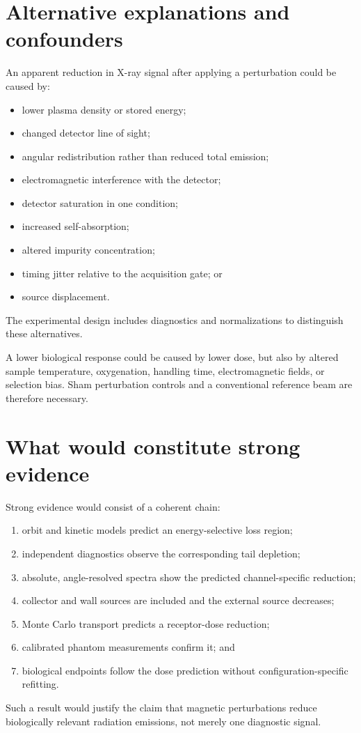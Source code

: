 \section{Alternative explanations and confounders}

An apparent reduction in X-ray signal after applying a perturbation could be caused by:
\begin{itemize}
\item lower plasma density or stored energy;
\item changed detector line of sight;
\item angular redistribution rather than reduced total emission;
\item electromagnetic interference with the detector;
\item detector saturation in one condition;
\item increased self-absorption;
\item altered impurity concentration;
\item timing jitter relative to the acquisition gate; or
\item source displacement.
\end{itemize}
The experimental design includes diagnostics and normalizations to distinguish these alternatives.

A lower biological response could be caused by lower dose, but also by altered sample temperature, oxygenation, handling time, electromagnetic fields, or selection bias. Sham perturbation controls and a conventional reference beam are therefore necessary.

\section{What would constitute strong evidence}

Strong evidence would consist of a coherent chain:
\begin{enumerate}
\item orbit and kinetic models predict an energy-selective loss region;
\item independent diagnostics observe the corresponding tail depletion;
\item absolute, angle-resolved spectra show the predicted channel-specific reduction;
\item collector and wall sources are included and the external source decreases;
\item Monte Carlo transport predicts a receptor-dose reduction;
\item calibrated phantom measurements confirm it; and
\item biological endpoints follow the dose prediction without configuration-specific refitting.
\end{enumerate}
Such a result would justify the claim that magnetic perturbations reduce biologically relevant radiation emissions, not merely one diagnostic signal.

